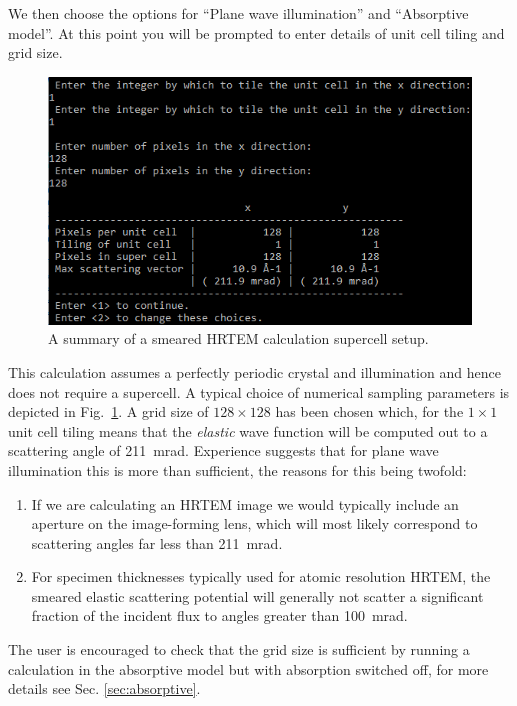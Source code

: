\documentclass[12pt,a4paper]{article}
\begin{document}
We then choose the options for ``Plane wave illumination'' and ``Absorptive model''.
At this point you will be prompted to enter details of unit cell tiling and grid size.
%
\begin{figure}[!h]
\begin{center}
\includegraphics[scale=0.75]{pw_abs_numerical.png}
\caption{A summary of a smeared HRTEM calculation supercell setup.}
\label{fig:pw_abs_numerical}
\end{center}
\end{figure}
%
This calculation assumes a perfectly periodic crystal and illumination and hence does not require a supercell.
A typical choice of numerical sampling parameters is depicted in Fig.~\ref{fig:pw_abs_numerical}.
A grid size of $128\times128$ has been chosen which, for the $1\times1$ unit cell tiling means that the \emph{elastic} wave function will be computed out to a scattering angle of 211~mrad. 
Experience suggests that for plane wave illumination this is more than sufficient, the reasons for this being twofold:
%
\begin{enumerate}
    \item{If we are calculating an HRTEM image we would typically include an aperture on the image-forming lens, which will most likely correspond to scattering angles far less than 211~mrad.}
    \item{For specimen thicknesses typically used for atomic resolution HRTEM, the smeared elastic scattering potential will generally not scatter a significant fraction of the incident flux to angles greater than 100~mrad.}
\end{enumerate}
%
The user is encouraged to check that the grid size is sufficient by running a calculation in the absorptive model but with absorption switched off, for more details see Sec. \ref{sec:absorptive}.
\end{document}
